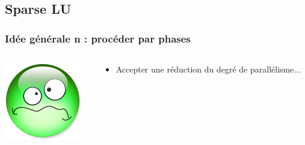 \documentclass[xcolor={x11names,svgnames},x11names,svgnames]{beamer}
\begin{document}

\subsection{Sparse LU}


\begin{frame}
  \frametitle{Idée générale n : procéder par \og phases\fg{}}

  \begin{columns}[c]
    \begin{column}{.1\textwidth}
      \vspace{1mm}
      \includegraphics[width=\textwidth]{triste.png}
    \end{column}
    
    \begin{column}{.9\textwidth}
      \begin{itemize}
      \item Accepter une réduction du degré de parallélisme...
      \end{itemize}
    \end{column}
  \end{columns}


\end{frame}
\end{document}
